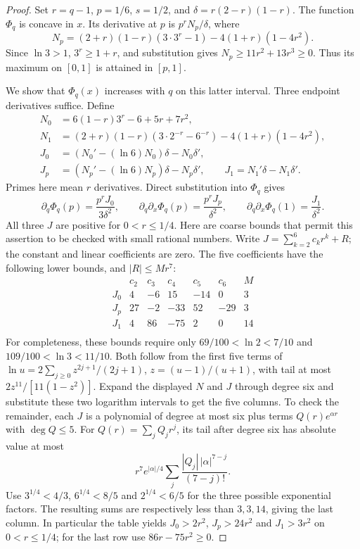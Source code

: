 \begin{proof}
Set $r=q-1$, $p=1/6$, $s=1/2$, and $\delta=r(2-r)(1-r)$.
The function $\Phi_q$ is concave in $x$. Its derivative at $p$ is
$p^rN_p/\delta$, where
\[
 N_p=(2+r)(1-r)(3\cdot3^r-1)-4(1+r)(1-4r^2).
\]
Since $\ln3>1$, $3^r\ge1+r$, and substitution gives
$N_p\ge11r^2+13r^3\ge0$. Thus its maximum on $[0,1]$ is attained
in $[p,1]$.

We show that $\Phi_q(x)$ increases with $q$ on this latter interval.
Three endpoint derivatives suffice. Define
\[
 \begin{split}
 N_0&=6(1-r)3^r-6+5r+7r^2,\\
 N_1&=(2+r)(1-r)(3\cdot2^{-r}-6^{-r})-4(1+r)(1-4r^2),\\
 J_0&=(N_0'-(\ln6)N_0)\delta-N_0\delta',\\
 J_p&=(N_p'-(\ln6)N_p)\delta-N_p\delta',\qquad
 J_1=N_1'\delta-N_1\delta'.
 \end{split}
\]
Primes here mean $r$ derivatives. Direct substitution into $\Phi_q$ gives
\[
 \partial_q\Phi_q(p)=\frac{p^rJ_0}{3\delta^2},\qquad
 \partial_q\partial_x\Phi_q(p)=\frac{p^rJ_p}{\delta^2},\qquad
 \partial_q\partial_x\Phi_q(1)=\frac{J_1}{\delta^2}.
\]
All three $J$ are positive for $0<r\le1/4$. Here are coarse bounds
that permit this assertion to be checked with small rational numbers.
Write $J=\sum_{k=2}^6c_kr^k+R$; the constant and linear coefficients
are zero. The five coefficients have the following lower bounds,
and $|R|\le Mr^7$:
\[
\begin{array}{c|rrrrr|r}
 &c_2&c_3&c_4&c_5&c_6&M\\\hline
J_0&4&-6&15&-14&0&3\\
J_p&27&-2&-33&52&-29&3\\
J_1&4&86&-75&2&0&14\\
\end{array}
\]
For completeness, these bounds require only
$69/100<\ln2<7/10$ and $109/100<\ln3<11/10$.
Both follow from the first five terms of
$\ln u=2\sum_{j\ge0}z^{2j+1}/(2j+1)$, $z=(u-1)/(u+1)$,
with tail at most $2z^{11}/[11(1-z^2)]$.
Expand the displayed $N$ and $J$ through degree six and substitute these
two logarithm intervals to get the five columns. To check the remainder,
each $J$ is a polynomial of degree at most six plus terms
$Q(r)e^{\alpha r}$ with $\deg Q\le5$.
For $Q(r)=\sum_jQ_jr^j$, its tail after degree six has absolute value at most
\[
 r^7 e^{|\alpha|/4}\sum_j
       \frac{|Q_j|\,|\alpha|^{7-j}}{(7-j)!}.
\]
Use $3^{1/4}<4/3$, $6^{1/4}<8/5$ and $2^{1/4}<6/5$ for the
three possible exponential factors. The resulting sums are respectively
less than $3,3,14$, giving the last column. In particular the table yields
$J_0>2r^2$, $J_p>24r^2$ and $J_1>3r^2$ on $0<r\le1/4$;
for the last row use $86r-75r^2\ge0$.


\end{proof}
